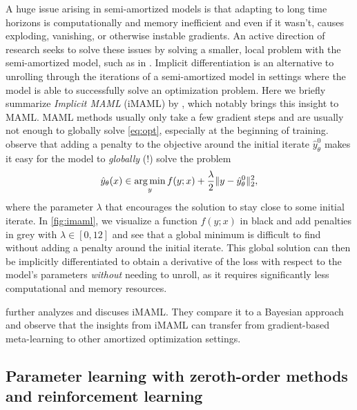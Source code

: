 \documentclass[twoside,11pt]{article}
\begin{document}
A huge issue arising in semi-amortized models is that adapting
to long time horizons is computationally and memory inefficient
and even if it wasn't, causes exploding, vanishing, or
otherwise instable gradients.
An active direction of research seeks to solve these issues by
solving a smaller, local problem with the semi-amortized model,
such as in \citet{chen2019modular,rajeswaran2019meta}.
Implicit differentiation is an alternative to unrolling through
the iterations of a semi-amortized model in settings where the
model is able to successfully solve an optimization problem.
Here we briefly summarize \emph{Implicit MAML} (iMAML) by \citet{rajeswaran2019meta},
which notably brings this insight to MAML.
MAML methods usually only take a few gradient steps and
are usually not enough to globally solve \cref{eq:opt},
especially at the beginning of training.
\citet{rajeswaran2019meta} observe that adding a penalty
to the objective around the initial iterate
$\hat y^0_\theta$ makes it easy for the model to
\emph{globally} (!) solve the problem
\begin{equation}
  \label{eq:iMAML}
  \hat y_\theta(x) \in \operatorname*{arg\,min}_y f(y; x) + \frac{\lambda}{2}\|y-\hat y^0_\theta\|_2^2,
\end{equation}
where the parameter $\lambda$ that encourages the
solution to stay close to some initial iterate.
In \cref{fig:imaml}, we visualize a function $f(y; x)$
in black and add penalties in grey with
$\lambda\in[0,12]$ and see that a global
minimum is difficult to find without adding a penalty
around the initial iterate.
This global solution can then be implicitly differentiated to obtain
a derivative of the loss with respect to the model's parameters
\emph{without} needing to unroll, as it requires
significantly less computational and memory resources.

\citet{huszar2019imaml} further analyzes and discuses iMAML.
They compare it to a Bayesian approach and observe that the insights
from iMAML can transfer from gradient-based meta-learning to
other amortized optimization settings.

\subsection{Parameter learning with zeroth-order methods
  and reinforcement learning}
\label{sec:learning:rl}
\end{document}
